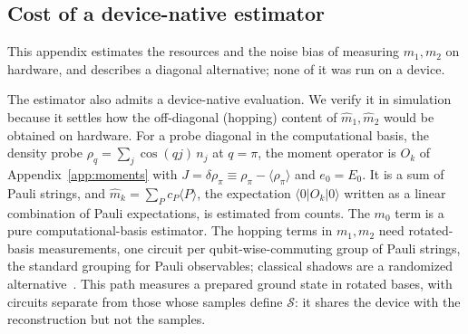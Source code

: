 \documentclass[submission, PhysCore]{SciPost}
\begin{document}
\begin{appendix}
\section{Cost of a device-native estimator}
\label{app:native}
This appendix estimates the resources and the noise bias of measuring $m_1,m_2$ on hardware, and describes a diagonal alternative; none of it was run on a device.

The estimator also admits a device-native evaluation. We verify it in simulation because it settles how the off-diagonal (hopping) content of $\widehat m_1,\widehat m_2$ would be obtained on hardware. For a probe diagonal in the computational basis, the density probe $\rho_q=\sum_j\cos(qj)\,n_j$ at $q=\pi$, the moment operator is $O_k$ of Appendix~\ref{app:moments} with $J=\delta\rho_\pi\equiv\rho_\pi-\langle\rho_\pi\rangle$ and $e_0=E_0$. It is a sum of Pauli strings, and ${\widehat m_k=\sum_P c_P\langle P\rangle}$, the expectation $\langle 0|O_k|0\rangle$ written as a linear combination of Pauli expectations, is estimated from counts. The $m_0$ term is a pure computational-basis estimator. The hopping terms in $m_1,m_2$ need rotated-basis measurements, one circuit per qubit-wise-commuting group of Pauli strings, the standard grouping for Pauli observables; classical shadows are a randomized alternative~\cite{HuangKuengPreskill2020}. This path measures a prepared ground state in rotated bases, with circuits separate from those whose samples define $\mathcal{S}$: it shares the device with the reconstruction but not the samples.


\end{appendix}
\end{document}
